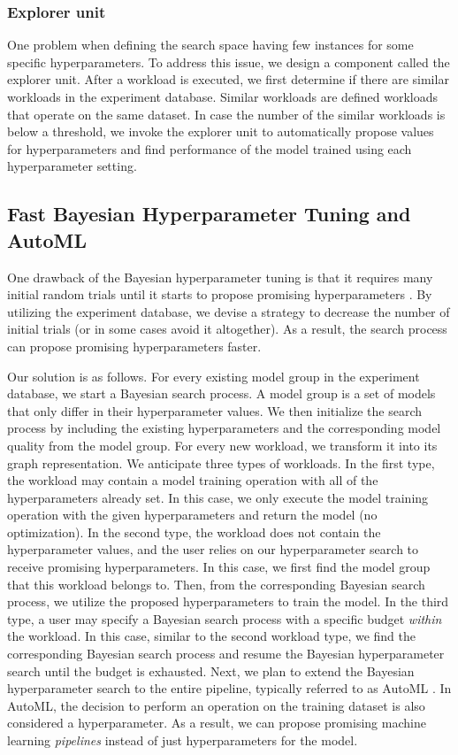 \subsubsection{Explorer unit}
One problem when defining the search space having few instances for some specific hyperparameters.
To address this issue, we design a component called the explorer unit.
After a workload is executed, we first determine if there are similar workloads in the experiment database.
Similar workloads are defined workloads that operate on the same dataset.
In case the number of the similar workloads is below a threshold, we invoke the explorer unit to automatically propose values for hyperparameters and find performance of the model trained using each hyperparameter setting.

\subsection{Fast Bayesian Hyperparameter Tuning and AutoML}
One drawback of the Bayesian hyperparameter tuning is that it requires many initial random trials until it starts to propose promising hyperparameters \cite{hutter2011sequential,snoek2012practical}.
By utilizing the experiment database, we devise a strategy to decrease the number of initial trials (or in some cases avoid it altogether).
As a result, the search process can propose promising hyperparameters faster.

Our solution is as follows.
For every existing model group in the experiment database, we start a Bayesian search process.
A model group is a set of models that only differ in their hyperparameter values.
We then initialize the search process by including the existing hyperparameters and the corresponding model quality from the model group.
For every new workload, we transform it into its graph representation.
We anticipate three types of workloads.
In the first type, the workload may contain a model training operation with all of the hyperparameters already set.
In this case, we only execute the model training operation with the given hyperparameters and return the model (no optimization).
In the second type, the workload does not contain the hyperparameter values, and the user relies on our hyperparameter search to receive promising hyperparameters.
In this case, we first find the model group that this workload belongs to.
Then, from the corresponding Bayesian search process, we utilize the proposed hyperparameters to train the model.
In the third type, a user may specify a Bayesian search process with a specific budget \textit{within} the workload.
In this case, similar to the second workload type, we find the corresponding Bayesian search process and resume the Bayesian hyperparameter search until the budget is exhausted.
Next, we plan to extend the Bayesian hyperparameter search to the entire pipeline, typically referred to as AutoML \cite{thornton2013auto}.
In AutoML, the decision to perform an operation on the training dataset is also considered a hyperparameter.
As a result, we can propose promising machine learning \textit{pipelines} instead of just hyperparameters for the model.

